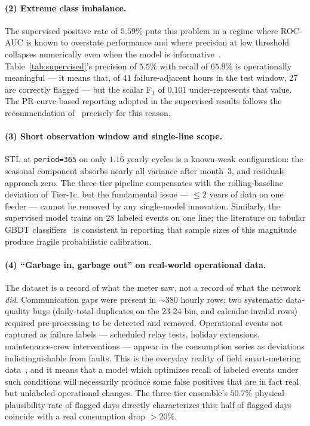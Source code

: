 \documentclass{article}
\begin{document}
\paragraph{(2) Extreme class imbalance.}
The supervised positive rate of $5.59\%$ puts this problem in a regime where ROC-AUC is known to overstate performance and where precision at low threshold collapses numerically even when the model is informative~\cite{saito2015precision,hand2009measuring}. Table~\ref{tab:supervised}'s precision of $5.5\%$ with recall of $65.9\%$ is operationally meaningful --- it means that, of $41$ failure-adjacent hours in the test window, $27$ are correctly flagged --- but the scalar F$_1$ of $0.101$ under-represents that value. The PR-curve-based reporting adopted in the supervised results follows the recommendation of~\cite{saito2015precision} precisely for this reason.

\paragraph{(3) Short observation window and single-line scope.}
STL at \texttt{period=365} on only $1.16$ yearly cycles is a known-weak configuration: the seasonal component absorbs nearly all variance after month~$3$, and residuals approach zero. The three-tier pipeline compensates with the rolling-baseline deviation of Tier-$1$c, but the fundamental issue --- $\leq 2$ years of data on one feeder --- cannot be removed by any single-model innovation. Similarly, the supervised model trains on $28$ labeled events on one line; the literature on tabular GBDT classifiers~\cite{shwartz2022tabular,chen2016xgboost} is consistent in reporting that sample sizes of this magnitude produce fragile probabilistic calibration.

\paragraph{(4) ``Garbage in, garbage out'' on real-world operational data.}
The dataset is a record of what the meter saw, not a record of what the network \emph{did}. Communication gaps were present in $\sim 380$ hourly rows; two systematic data-quality bugs (daily-total duplicates on the $23$-$24$ bin, and calendar-invalid rows) required pre-processing to be detected and removed. Operational events not captured as failure labels --- scheduled relay tests, holiday extensions, maintenance-crew interventions --- appear in the consumption series as deviations indistinguishable from faults. This is the everyday reality of field smart-metering data~\cite{himeur2021survey}, and it means that a model which optimizes recall of labeled events under such conditions will necessarily produce some false positives that are in fact real but unlabeled operational changes. The three-tier ensemble's $50.7\%$ physical-plausibility rate of flagged days directly characterizes this: half of flagged days coincide with a real consumption drop $>20\%$.
\end{document}
